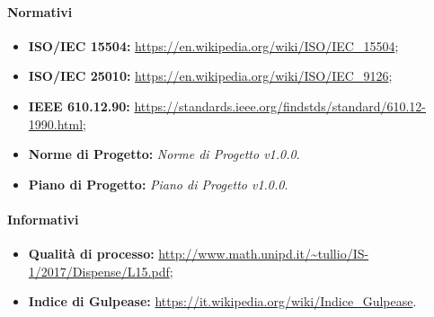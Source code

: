 		\paragraph{Normativi}
			\begin{itemize}
				\item \textbf{ISO/IEC 15504:} \url{https://en.wikipedia.org/wiki/ISO/IEC_15504};
				\item \textbf{ISO/IEC 25010:} \url{https://en.wikipedia.org/wiki/ISO/IEC_9126};
				\item \textbf{IEEE 610.12.90:} \url{https://standards.ieee.org/findstds/standard/610.12-1990.html};
				\item \textbf{Norme di Progetto:} \emph{Norme di Progetto v1.0.0}.
				\item \textbf{Piano di Progetto:} \emph{Piano di Progetto v1.0.0}.
			\end{itemize}

		\paragraph{Informativi} 
			\begin{itemize}
				\item \textbf{Qualità di processo:} \url{http://www.math.unipd.it/~tullio/IS-1/2017/Dispense/L15.pdf};
				\item \textbf{Indice di Gulpease:} \url{https://it.wikipedia.org/wiki/Indice_Gulpease}.
			\end{itemize}